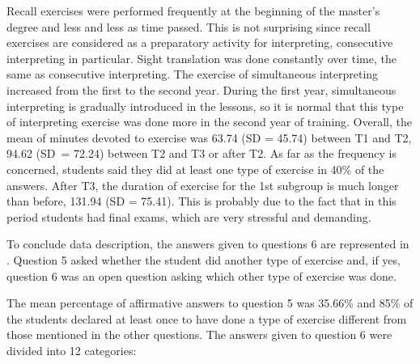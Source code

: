 \documentclass[output=paper]{../langscibook}
\begin{document}
Recall exercises were performed frequently at the beginning of the master’s degree and less and less as time passed. This is not surprising since recall exercises are considered as a preparatory activity for interpreting, consecutive interpreting in particular. Sight translation was done constantly over time, the same as consecutive interpreting. The exercise of simultaneous interpreting increased from the first to the second year. During the first year, simultaneous interpreting is gradually introduced in the lessons, so it is normal that this type of interpreting exercise was done more in the second year of training. Overall, the mean of minutes devoted to exercise was 63.74 (SD = 45.74) between T1 and T2, 94.62 (SD~= 72.24) between T2 and T3 or after T2. As far as the frequency is concerned, students said they did at least one type of exercise in 40\% of the answers. After T3, the duration of exercise for the 1st subgroup is much longer than before, 131.94 (SD = 75.41). This is probably due to the fact that in this period students had final exams, which are very stressful and demanding.

To conclude data description, the answers given to questions 6 are represented in . Question 5 asked whether the student did another type of exercise and, if yes, question 6 was an open question asking which other type of exercise was done.

The mean percentage of affirmative answers to question 5 was 35.66\% and 85\% of the students declared at least once to have done a type of exercise different from those mentioned in the other questions. The answers given to question 6 were divided into 12 categories:
\end{document}
